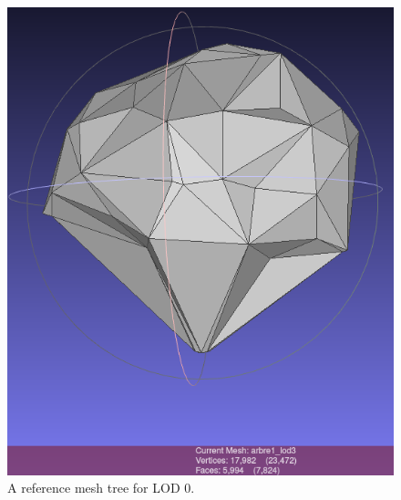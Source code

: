 \documentclass[12pt]{article}
\begin{document}
\begin{figure}[H]
    \centering
    \begin{minipage}{0.45\textwidth}
        \centering
        \includegraphics[width=\textwidth]{images/lod0.png}
        \caption{A reference mesh tree for LOD 0.}
    \end{minipage}\hfill
    \begin{minipage}{0.45\textwidth}
        \centering

\end{minipage}
\end{figure}
\end{document}
